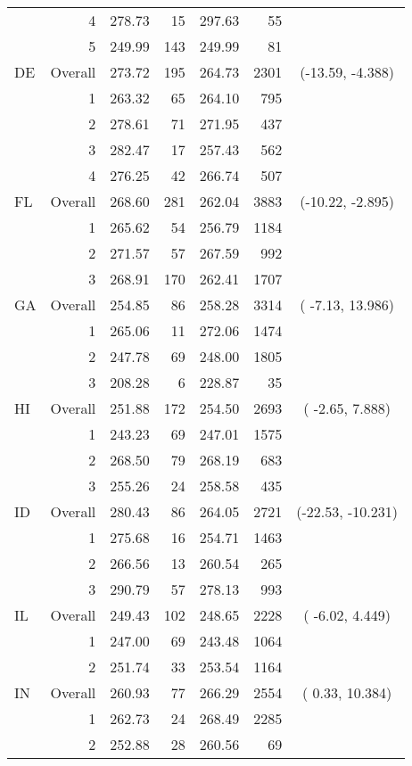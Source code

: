 \begin{longtable}{lrrr@{\extracolsep{.25cm}}rrc}
   & 4 & 278.73 &  15 & 297.63 &  55 &  \\ 
   & 5 & 249.99 & 143 & 249.99 &  81 &  \\ 
   \hline
DE & Overall & 273.72 & 195 & 264.73 & 2301 & (-13.59,  -4.388) \\ 
   & 1 & 263.32 &  65 & 264.10 & 795 &  \\ 
   & 2 & 278.61 &  71 & 271.95 & 437 &  \\ 
   & 3 & 282.47 &  17 & 257.43 & 562 &  \\ 
   & 4 & 276.25 &  42 & 266.74 & 507 &  \\ 
   \hline
FL & Overall & 268.60 & 281 & 262.04 & 3883 & (-10.22,  -2.895) \\ 
   & 1 & 265.62 &  54 & 256.79 & 1184 &  \\ 
   & 2 & 271.57 &  57 & 267.59 & 992 &  \\ 
   & 3 & 268.91 & 170 & 262.41 & 1707 &  \\ 
   \hline
GA & Overall & 254.85 &  86 & 258.28 & 3314 & ( -7.13,  13.986) \\ 
   & 1 & 265.06 &  11 & 272.06 & 1474 &  \\ 
   & 2 & 247.78 &  69 & 248.00 & 1805 &  \\ 
   & 3 & 208.28 &   6 & 228.87 &  35 &  \\ 
   \hline
HI & Overall & 251.88 & 172 & 254.50 & 2693 & ( -2.65,   7.888) \\ 
   & 1 & 243.23 &  69 & 247.01 & 1575 &  \\ 
   & 2 & 268.50 &  79 & 268.19 & 683 &  \\ 
   & 3 & 255.26 &  24 & 258.58 & 435 &  \\ 
   \hline
ID & Overall & 280.43 &  86 & 264.05 & 2721 & (-22.53, -10.231) \\ 
   & 1 & 275.68 &  16 & 254.71 & 1463 &  \\ 
   & 2 & 266.56 &  13 & 260.54 & 265 &  \\ 
   & 3 & 290.79 &  57 & 278.13 & 993 &  \\ 
   \hline
IL & Overall & 249.43 & 102 & 248.65 & 2228 & ( -6.02,   4.449) \\ 
   & 1 & 247.00 &  69 & 243.48 & 1064 &  \\ 
   & 2 & 251.74 &  33 & 253.54 & 1164 &  \\ 
   \hline
IN & Overall & 260.93 &  77 & 266.29 & 2554 & (  0.33,  10.384) \\ 
   & 1 & 262.73 &  24 & 268.49 & 2285 &  \\ 
   & 2 & 252.88 &  28 & 260.56 &  69 &  \\ 

\end{longtable}
